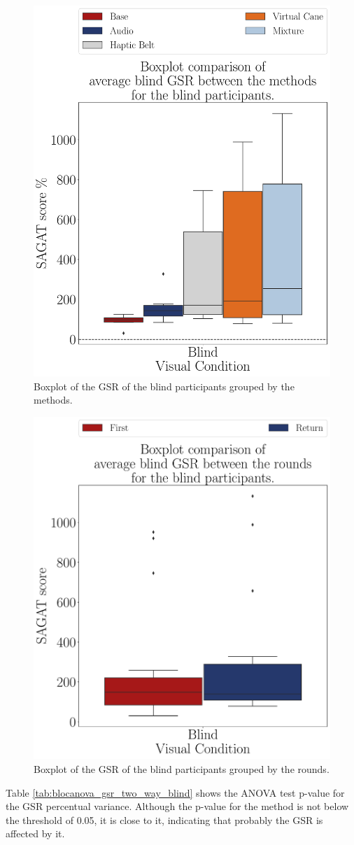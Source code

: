 \begin{figure}[!htb]
    \centering
    \includegraphics[width = 0.75\linewidth]{3 - Resultados/Figuras/boxplot_gsr_avg_blind_scene.pdf}
    \caption{Boxplot of the GSR of the blind participants grouped by the methods.}
    \label{fig:boxplot_gsr_avg_blind_scene}
\end{figure}
\begin{figure}[!htb]
    \centering
    \includegraphics[width = 0.75\linewidth]{3 - Resultados/Figuras/boxplot_gsr_avg_blind_rounds.pdf}
    \caption{Boxplot of the GSR of the blind participants grouped by the rounds.}
    \label{fig:boxplot_gsr_avg_blind_rounds}
\end{figure}

Table \ref{tab:blocanova_gsr_two_way_blind} shows the ANOVA test p-value for the GSR percentual variance. Although the p-value for the method is not below the threshold of 0.05, it is close to it, indicating that probably the GSR is affected by it. 




